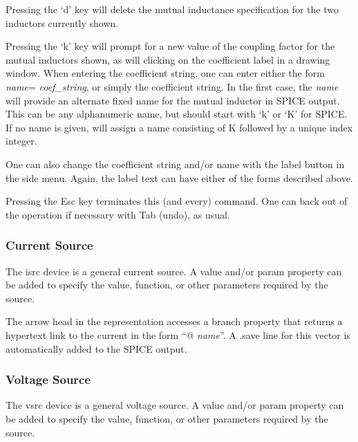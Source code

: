 Pressing the `{\kb d}' key will delete the mutual inductance
specification for the two inductors currently shown. 

Pressing the `{\kb k}' key will prompt for a new value of the coupling
factor for the mutual inductors shown, as will clicking on the
coefficient label in a drawing window.  When entering the coefficient
string, one can enter either the form {\it name\/}={\it
coef\_string\/}, or simply the coefficient string.  In the first case,
the {\it name} will provide an alternate fixed name for the mutual
inductor in SPICE output.  This can be any alphanumeric name, but
should start with `k' or `K' for SPICE.  If no name is given, {\Xic}
will assign a name consisting of {\vt K} followed by a unique index
integer.

One can also change the coefficient string and/or name with the {\cb
label} button in the side menu.  Again, the label text can have either
of the forms described above.

Pressing the {\kb Esc} key terminates this (and every) command.  One
can back out of the operation if necessary with {\kb Tab} (undo), as
usual. 

\subsubsection{Current Source}

The {\et isrc} device is a general current source.  A {\et value}
and/or {\et param} property can be added to specify the value,
function, or other parameters required by the source.

The arrow head in the representation accesses a {\et branch} property
that returns a hypertext link to the current in the form ``{\vt @}{\it
name}{\vt [c]}''.  A {\vt .save} line for this vector is automatically
added to the SPICE output.

\subsubsection{Voltage Source}

The {\et vsrc} device is a general voltage source.  A {\et value}
and/or {\et param} property can be added to specify the value,
function, or other parameters required by the source.

